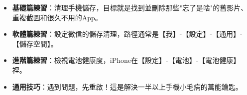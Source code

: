 
\begin{itemize}
  \item \textbf{基礎篇練習}：清理手機儲存，目標就是找到並刪除那些"忘了是啥"的舊影片、重複截圖和很久不用的App。
  \item \textbf{軟體篇練習}：設定微信的儲存清理，路徑通常是【我】-【設定】-【通用】-【儲存空間】。
  \item \textbf{進階篇練習}：檢視電池健康度，iPhone在【設定】-【電池】-【電池健康】裡。
  \item \textbf{通用技巧}：遇到問題，先重啟！這是解決一半以上手機小毛病的萬能鑰匙。
\end{itemize}
